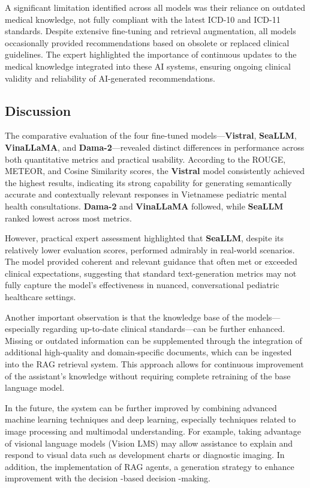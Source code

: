 \documentclass[conference]{IEEEtran}
\begin{document}
A significant limitation identified across all models was their reliance on outdated medical knowledge, not fully compliant with the latest ICD-10 and ICD-11 standards. Despite extensive fine-tuning and retrieval augmentation, all models occasionally provided recommendations based on obsolete or replaced clinical guidelines. The expert highlighted the importance of continuous updates to the medical knowledge integrated into these AI systems, ensuring ongoing clinical validity and reliability of AI-generated recommendations.

\subsection{Discussion}

The comparative evaluation of the four fine-tuned models—\textbf{Vistral}, \textbf{SeaLLM}, \textbf{VinaLLaMA}, and \textbf{Dama-2}—revealed distinct differences in performance across both quantitative metrics and practical usability. According to the ROUGE, METEOR, and Cosine Similarity scores, the \textbf{Vistral} model consistently achieved the highest results, indicating its strong capability for generating semantically accurate and contextually relevant responses in Vietnamese pediatric mental health consultations. \textbf{Dama-2} and \textbf{VinaLLaMA} followed, while \textbf{SeaLLM} ranked lowest across most metrics.

However, practical expert assessment highlighted that \textbf{SeaLLM}, despite its relatively lower evaluation scores, performed admirably in real-world scenarios. The model provided coherent and relevant guidance that often met or exceeded clinical expectations, suggesting that standard text-generation metrics may not fully capture the model's effectiveness in nuanced, conversational pediatric healthcare settings.

Another important observation is that the knowledge base of the models—especially regarding up-to-date clinical standards—can be further enhanced. Missing or outdated information can be supplemented through the integration of additional high-quality and domain-specific documents, which can be ingested into the RAG retrieval system. This approach allows for continuous improvement of the assistant's knowledge without requiring complete retraining of the base language model.

In the future, the system can be further improved by combining advanced machine learning techniques and deep learning, especially techniques related to image processing and multimodal understanding. For example, taking advantage of visional language models (Vision LMS) may allow assistance to explain and respond to visual data such as development charts or diagnostic imaging. In addition, the implementation of RAG agents, a generation strategy to enhance improvement with the decision -based decision -making.
\end{document}
